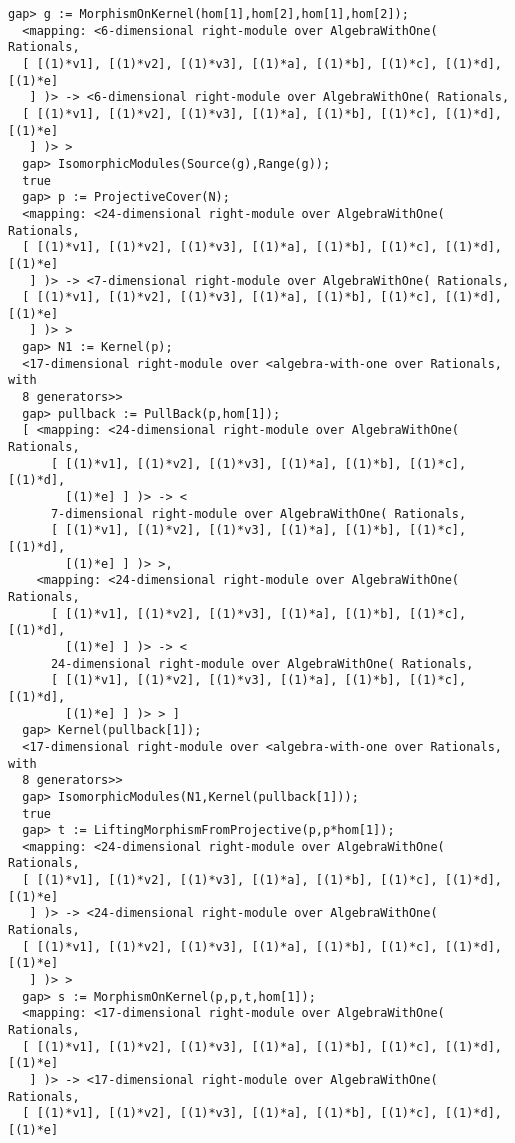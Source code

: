 \documentclass[a4paper,11pt]{report}
\begin{document}
{{ 
\begin{Verbatim}[fontsize=\small,frame=single,label=Example]
  gap> g := MorphismOnKernel(hom[1],hom[2],hom[1],hom[2]);
  <mapping: <6-dimensional right-module over AlgebraWithOne( Rationals, 
  [ [(1)*v1], [(1)*v2], [(1)*v3], [(1)*a], [(1)*b], [(1)*c], [(1)*d], [(1)*e] 
   ] )> -> <6-dimensional right-module over AlgebraWithOne( Rationals, 
  [ [(1)*v1], [(1)*v2], [(1)*v3], [(1)*a], [(1)*b], [(1)*c], [(1)*d], [(1)*e] 
   ] )> >
  gap> IsomorphicModules(Source(g),Range(g));
  true
  gap> p := ProjectiveCover(N);
  <mapping: <24-dimensional right-module over AlgebraWithOne( Rationals, 
  [ [(1)*v1], [(1)*v2], [(1)*v3], [(1)*a], [(1)*b], [(1)*c], [(1)*d], [(1)*e] 
   ] )> -> <7-dimensional right-module over AlgebraWithOne( Rationals, 
  [ [(1)*v1], [(1)*v2], [(1)*v3], [(1)*a], [(1)*b], [(1)*c], [(1)*d], [(1)*e] 
   ] )> >
  gap> N1 := Kernel(p);
  <17-dimensional right-module over <algebra-with-one over Rationals, with 
  8 generators>>
  gap> pullback := PullBack(p,hom[1]);
  [ <mapping: <24-dimensional right-module over AlgebraWithOne( Rationals, 
      [ [(1)*v1], [(1)*v2], [(1)*v3], [(1)*a], [(1)*b], [(1)*c], [(1)*d], 
        [(1)*e] ] )> -> <
      7-dimensional right-module over AlgebraWithOne( Rationals, 
      [ [(1)*v1], [(1)*v2], [(1)*v3], [(1)*a], [(1)*b], [(1)*c], [(1)*d], 
        [(1)*e] ] )> >, 
    <mapping: <24-dimensional right-module over AlgebraWithOne( Rationals, 
      [ [(1)*v1], [(1)*v2], [(1)*v3], [(1)*a], [(1)*b], [(1)*c], [(1)*d], 
        [(1)*e] ] )> -> <
      24-dimensional right-module over AlgebraWithOne( Rationals, 
      [ [(1)*v1], [(1)*v2], [(1)*v3], [(1)*a], [(1)*b], [(1)*c], [(1)*d], 
        [(1)*e] ] )> > ]
  gap> Kernel(pullback[1]);
  <17-dimensional right-module over <algebra-with-one over Rationals, with 
  8 generators>>
  gap> IsomorphicModules(N1,Kernel(pullback[1]));
  true
  gap> t := LiftingMorphismFromProjective(p,p*hom[1]);
  <mapping: <24-dimensional right-module over AlgebraWithOne( Rationals, 
  [ [(1)*v1], [(1)*v2], [(1)*v3], [(1)*a], [(1)*b], [(1)*c], [(1)*d], [(1)*e] 
   ] )> -> <24-dimensional right-module over AlgebraWithOne( Rationals, 
  [ [(1)*v1], [(1)*v2], [(1)*v3], [(1)*a], [(1)*b], [(1)*c], [(1)*d], [(1)*e] 
   ] )> >
  gap> s := MorphismOnKernel(p,p,t,hom[1]);    
  <mapping: <17-dimensional right-module over AlgebraWithOne( Rationals, 
  [ [(1)*v1], [(1)*v2], [(1)*v3], [(1)*a], [(1)*b], [(1)*c], [(1)*d], [(1)*e] 
   ] )> -> <17-dimensional right-module over AlgebraWithOne( Rationals, 
  [ [(1)*v1], [(1)*v2], [(1)*v3], [(1)*a], [(1)*b], [(1)*c], [(1)*d], [(1)*e] 

\end{Verbatim}}}
\end{document}

